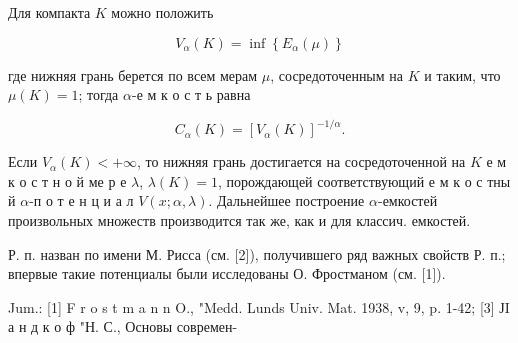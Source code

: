 \documentclass[10pt]{article}
\begin{document}
Для компакта $K$ можно положить



\[

V_{\alpha}(K)=\inf \left\{E_{\alpha}(\mu)\right\}

\]



где нижняя грань берется по всем мерам $\mu$, сосредоточенным на $K$ и таким, что $\mu(K)=1$; тогда $\alpha$-е м к о с т ь равна



\[

C_{\alpha}(K)=\left[V_{\alpha}(K)\right]^{-1 / \alpha} .

\]



Если $V_{\alpha}(K)<+\infty$, то нижняя грань достигается на сосредоточенной на $K$ е м к о с т н о й ме р е $\lambda$, $\lambda(K)=1$, порождающей соответствующий е м к о с тны й $\alpha$-п о т е н ц и а л $V(x ; \alpha, \lambda)$. Дальнейшее построение $\alpha$-емкостей произвольных множеств производится так же, как и для классич. емкостей.



Р. п. назван по имени М. Рисса (см. [2]), получившего ряд важных свойств Р. п.; впервые такие потенциалы были исследованы О. Фростманом (см. [1]).



Jum.: [1] F r o s t m a n n O., "Medd. Lunds Univ. Mat. 1938, v, 9, p. 1-42; [3] ЈI а н д к о ф "Н. С., Основы современ-
\end{document}
